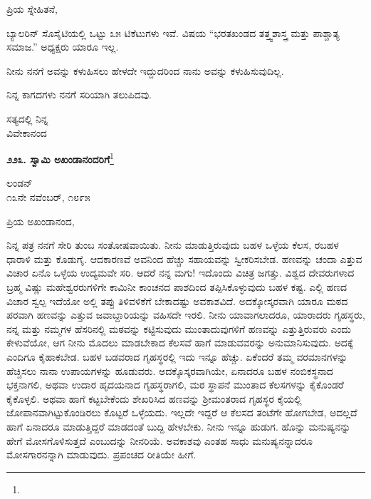 \vspace{-0.3cm}

\noindent
ಪ್ರಿಯ ಸ್ನೇಹಿತನೆ,

ಬ್ಯಾಲರಿನ್ ಸೊಸೈಟಿಯಲ್ಲಿ ಒಟ್ಟು ೩೫ ಟಿಕೆಟುಗಳು ಇವೆ. ವಿಷಯ “ಭರತಖಂಡದ ತತ್ತ್ವಶಾಸ್ತ್ರ ಮತ್ತು ಪಾಶ್ಚಾತ್ಯ ಸಮಾಜ.” ಅಧ್ಯಕ್ಷರು ಯಾರೂ ಇಲ್ಲ.

ನೀನು ನನಗೆ ಅವನ್ನು ಕಳುಹಿಸಲು ಹೇಳದೇ ಇದ್ದುದರಿಂದ ನಾನು ಅವನ್ನು ಕಳುಹಿಸುವುದಿಲ್ಲ.

ನಿನ್ನ ಕಾಗದಗಳು ನನಗೆ ಸರಿಯಾಗಿ ತಲುಪಿದವು.

\vspace{-0.5cm}

{\flushright
ಸತ್ಯದಲ್ಲಿ ನಿನ್ನ\\ವಿವೇಕಾನಂದ\par}

\begin{center}
\textbf{೨೨೩. ಸ್ವಾಮಿ ಅಖಂಡಾನಂದರಿಗೆ}\footnote{}
\end{center}

\vspace{-0.5cm}

\begin{flushright}
ಲಂಡನ್\\೧೩ನೇ ನವೆಂಬರ್, ೧೮೯೫
\end{flushright}

\vspace{-0.3cm}

\noindent
ಪ್ರಿಯ ಅಖಂಡಾನಂದ,

ನಿನ್ನ ಪತ್ರ ನನಗೆ ಸೇರಿ ತುಂಬ ಸಂತೋಷವಾಯಿತು. ನೀನು ಮಾಡುತ್ತಿರುವುದು ಬಹಳ ಒಳ್ಳೆಯ ಕೆಲಸ, ರ\enginline{-}ಬಹಳ ಧಾರಾಳಿ ಮತ್ತು ಕೊಡುಗೈ. ಆದಕಾರಣವೆ ಅವನಿಂದ ಹೆಚ್ಚು ಸಹಾಯವನ್ನು ಸ್ವೀಕರಿಸಬೇಡ. ಹಣವನ್ನು ಚಂದಾ ಎತ್ತುವ ವಿಚಾರ ಏನೊ ಒಳ್ಳೆಯ ಉದ್ಯಮವೇ ಸರಿ. ಆದರೆ ನನ್ನ ಮಗು! ಇದೊಂದು ವಿಚಿತ್ರ ಜಗತ್ತು. ವಿಶ್ವದ ದೇವರುಗಳಾದ ಬ್ರಹ್ಮ ವಿಷ್ಣು ಮಹೇಶ್ವರರುಗಳಿಗೇ ಕಾಮಿನೀ ಕಾಂಚನದ ಪಾಶದಿಂದ ತಪ್ಪಿಸಿಕೊಳ್ಳುವುದು ಬಹಳ ಕಷ್ಟ. ಎಲ್ಲಿ ಹಣದ ವಿಚಾರ ಸ್ವಲ್ಪ ಇದೆಯೋ ಅಲ್ಲಿ ತಪ್ಪು ತಿಳಿವಳಿಕೆಗೆ ಬೇಕಾದಷ್ಟು ಅವಕಾಶವಿದೆ. ಅದಕ್ಕೋಸ್ಕರವಾಗಿ ಯಾರೂ ಮಠದ ಪರವಾಗಿ ಹಣವನ್ನು ಎತ್ತುವ ಜವಾಬ್ದಾರಿಯನ್ನು ವಹಿಸದೇ ಇರಲಿ. ನೀನು ಯಾವಾಗಲಾದರೂ, ಯಾರಾದರು ಗೃಹಸ್ಥರು, ನನ್ನ ಮತ್ತು ನಮ್ಮಗಳ ಹೆಸರಿನಲ್ಲಿ ಮಠವನ್ನು ಕಟ್ಟಿಸುವುದು ಮುಂತಾದುವುಗಳಿಗೆ ಹಣವನ್ನು ಎತ್ತುತ್ತಿರುವರು ಎಂದು ಕೇಳುವೆಯೋ, ಆಗ ನೀನು ಮೊದಲು ಮಾಡಬೇಕಾದ ಕೆಲಸವೆ ಹಾಗೆ ಮಾಡುವವರನ್ನು ಅನುಮಾನಿಸುವುದು. ಅದಕ್ಕೆ ಎಂದಿಗೂ ಕೈಹಾಕಬೇಡ. ಬಹಳ ಬಡವರಾದ ಗೃಹಸ್ಥರಲ್ಲಿ ಇದು ಇನ್ನೂ ಹೆಚ್ಚು. ಏಕೆಂದರೆ ತಮ್ಮ ವರಮಾನಗಳನ್ನು ಹೆಚ್ಚಿಸಲು ನಾನಾ ಉಪಾಯಗಳನ್ನು ಹೂಡುವರು. ಅದಕ್ಕೊಸ್ಕರವಾಗಿಯೇ, ಏನಾದರೂ ಬಹಳ ನಂಬಿಕಸ್ಥನಾದ ಭಕ್ತನಾಗಲಿ, ಅಥವಾ ಉದಾರ ಹೃದಯನಾದ ಗೃಹಸ್ಥರಾಗಲಿ, ಮಠ ಸ್ಥಾಪನೆ ಮುಂತಾದ ಕೆಲಸಗಳನ್ನು ಕೈಕೊಂಡರೆ ಕೈಕೊಳ್ಳಲಿ. ಅಥವಾ ಹಾಗೆ ಕಟ್ಟಬೇಕೆಂದು ಶೇಖರಿಸಿದ ಹಣವನ್ನು ಶ‍್ರೀಮಂತರಾದ ಗೃಹಸ್ಥರ ಕೈಯಲ್ಲಿ ಜೋಪಾನವಾಗಿಟ್ಟುಕೊಂಡಿರಲು ಕೊಟ್ಟರೆ ಒಳ್ಳೆಯದು. ಇಲ್ಲದೇ ಇದ್ದರೆ ಆ ಕೆಲಸದ ತಂಟೆಗೇ ಹೋಗಬೇಡ, ಅದಲ್ಲದೆ ಹಾಗೆ ಏನಾದರೂ ಮಾಡುತ್ತಿದ್ದರೆ ಮಾಡದಂತೆ ಬುದ್ದಿ ಹೇಳಬೇಕು. ನೀನು ಇನ್ನೂ ಹುಡುಗ. ಹೊನ್ನು ಮನುಷ್ಯನನ್ನು ಹೇಗೆ ಮೋಸಗೊಳಿಸುತ್ತದೆ ಎಂಬುದನ್ನು ನೀನರಿಯೆ. ಅವಕಾಶವು ಎಂತಹ ಸಾಧು ಮನುಷ್ಯನನ್ನಾದರೂ ಮೋಸಗಾರನನ್ನಾಗಿ ಮಾಡುವುದು. ಪ್ರಪಂಚದ ರೀತಿಯೇ ಹೀಗೆ.

